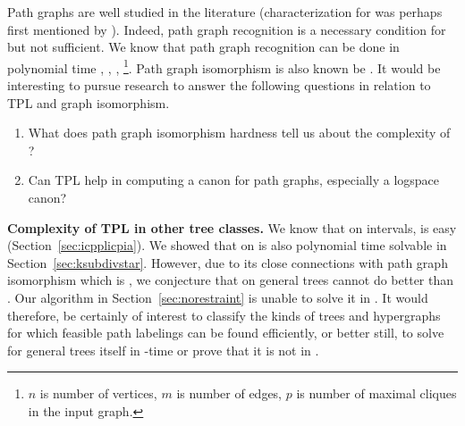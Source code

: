 Path graphs are well studied
in the literature (characterization for \uvgraphs was perhaps first
mentioned by \cite{plr70}).
Indeed, path graph recognition is a necessary condition for \CFTPL but
not sufficient.  We know that path graph recognition can be done in
polynomial time \cite[first algorithm.
$O\left(pn^3\right)$]{gav78},\cite[$O\left(p(m+n)\right)$]{aas93}
\cite{sb94}, \cite[linear algorithm]{db95}, \cite[PR-trees]{cha11}
\footnote{$n$ is number of vertices, $m$ is number of edges, $p$ is
  number of maximal cliques in the input graph.}.  Path graph
isomorphism is also known be \gicomplete \cite{bpt96}.  It would be
interesting to pursue research to answer the following questions in
relation to TPL and graph isomorphism.
\begin{enumerate}
\item What does path graph isomorphism hardness tell us about the
  complexity of \CFTPL?
\item Can TPL help in computing a canon for path graphs, especially a
  logspace canon?
\end{enumerate}



\textbf{Complexity of TPL in other tree classes.}  We know that on
intervals, \CFTPL is easy (Section~\ref{sec:icpplicpia}).  We showed
that \CFTPL on {\kstar} is also polynomial time solvable in
Section~\ref{sec:ksubdivstar}. However, due to its close connections
with path graph isomorphism which is \gicomplete \cite{kklv10}, we
conjecture that \CFTPL on general trees cannot do better than
\gicomplete. Our algorithm in Section~\ref{sec:norestraint} is unable to
solve it in \p. It would therefore, be certainly of interest to
classify the kinds of trees and hypergraphs for which feasible path
labelings can be found efficiently, or better still, to solve \CFTPL
for general trees itself in \p-time or prove that it is not in \p.


